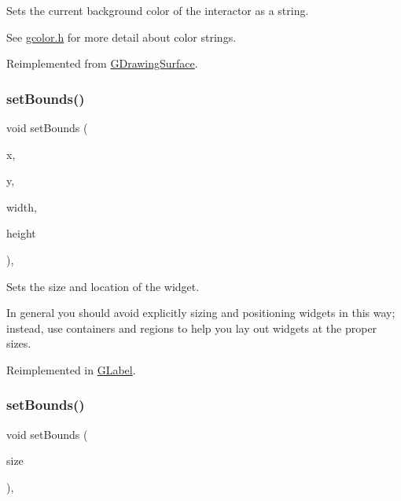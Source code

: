 Sets the current background color of the interactor as a string. 

See \mbox{\hyperlink{gcolor_8h_source}{gcolor.\+h}} for more detail about color strings. 

Reimplemented from \mbox{\hyperlink{classGDrawingSurface_ab4677ab2474e68b07aa56605af92a84a}{G\+Drawing\+Surface}}.

\mbox{\label{classGInteractor_a2aae8197624b72265ab83b4f1bc73f2f}} 
\subsubsection{\texorpdfstring{set\+Bounds()}{setBounds()}\hspace{0.1cm}{\footnotesize\ttfamily [1/2]}}
{\footnotesize\ttfamily void set\+Bounds (\begin{DoxyParamCaption}\item[{double}]{x,  }\item[{double}]{y,  }\item[{double}]{width,  }\item[{double}]{height }\end{DoxyParamCaption})\hspace{0.3cm}{\ttfamily [virtual]}, {\ttfamily [inherited]}}



Sets the size and location of the widget. 

In general you should avoid explicitly sizing and positioning widgets in this way; instead, use containers and regions to help you lay out widgets at the proper sizes. 

Reimplemented in \mbox{\hyperlink{classGLabel_aab3121dc97f8c5c1ddee39ea81d08509}{G\+Label}}.

\mbox{\label{classGInteractor_acada386653f008cacc7cce86426bef7c}} 
\subsubsection{\texorpdfstring{set\+Bounds()}{setBounds()}\hspace{0.1cm}{\footnotesize\ttfamily [2/2]}}
{\footnotesize\ttfamily void set\+Bounds (\begin{DoxyParamCaption}\item[{const \mbox{\hyperlink{classGRectangle}{G\+Rectangle}} \&}]{size }\end{DoxyParamCaption})\hspace{0.3cm}{\ttfamily [virtual]}, {\ttfamily [inherited]}}



